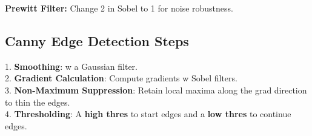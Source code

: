 \textbf{Prewitt Filter:} Change 2 in Sobel to 1 for noise robustness.
\subsection*{Canny Edge Detection Steps}
1. \textbf{Smoothing}: w a Gaussian filter.\\
2. \textbf{Gradient Calculation}: Compute gradients w Sobel filters.\\
3. \textbf{Non-Maximum Suppression}: Retain local maxima along the grad direction to thin the edges.\\
4. \textbf{Thresholding}: A \textbf{high thres} to start edges and a \textbf{low thres} to continue edges.
